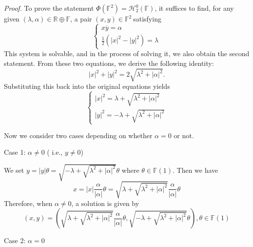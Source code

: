 \documentclass[a4paper]{article}%
\newenvironment{proof}[1][Proof]{\noindent\textit{#1.} }{}
\begin{document}
\begin{proof}
To prove the statement $\Phi\left(  \mathbb{F}^{2}\right)  =\mathcal{H}%
_{2}^{0}(\mathbb{F})$, it suffices to find, for any given $(\lambda,\alpha
)\in\mathbb{R}\oplus\mathbb{F}$, a pair $\left(  x,y\right)  \in\mathbb{F}%
^{2}\ $satisfying
\[%
\begin{cases}
x\overline{y}=\alpha\\
\frac{1}{2}(\left\vert x\right\vert ^{2}-\left\vert y\right\vert ^{2})=\lambda
\end{cases}
\]
This system is solvable, and in the process of solving it, we also obtain the
second statement. From these two equations, we derive the following identity:
\[
\left\vert x\right\vert ^{2}+\left\vert y\right\vert ^{2}=2\sqrt{\lambda
^{2}+\left\vert \alpha\right\vert ^{2}}.
\]
Substituting this back into the original equations yields
\[%
\begin{cases}
\left\vert x\right\vert ^{2}=\lambda+\sqrt{\lambda^{2}+\left\vert
\alpha\right\vert ^{2}}\\
\left\vert y\right\vert ^{2}=-\lambda+\sqrt{\lambda^{2}+\left\vert
\alpha\right\vert ^{2}}%
\end{cases}
\]


Now we consider two cases depending on whether $\alpha= 0$ or not.

Case 1: $\alpha\neq0$ ( i.e., $y\neq0$)

We set $y=\left\vert y\right\vert \theta=\sqrt{-\lambda+\sqrt{\lambda
^{2}+\left\vert \alpha\right\vert ^{2}}}\theta$ where $\theta\in\mathbb{F}%
(1)$. Then we have
\[
x=\left\vert x\right\vert \frac{\alpha}{\left\vert \alpha\right\vert }%
\theta=\sqrt{\lambda+\sqrt{\lambda^{2}+\left\vert \alpha\right\vert ^{2}}%
}\frac{\alpha}{\left\vert \alpha\right\vert }\theta
\]
Therefore, when $\alpha\neq0$, a solution is given by
\[
(x,y)=\left(  \sqrt{\lambda+\sqrt{\lambda^{2}+\left\vert \alpha\right\vert
^{2}}}\frac{\alpha}{\left\vert \alpha\right\vert }\theta,\sqrt{-\lambda
+\sqrt{\lambda^{2}+\left\vert \alpha\right\vert ^{2}}}\theta\right)
,\theta\in\mathbb{F}(1)
\]


Case 2: $\alpha=0$


\end{proof}
\end{document}
